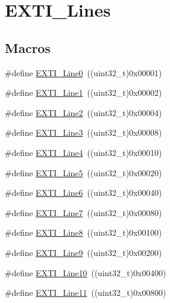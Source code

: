 \hypertarget{group___e_x_t_i___lines}{\section{E\-X\-T\-I\-\_\-\-Lines}
\label{group___e_x_t_i___lines}
}
\subsection*{Macros}
\begin{DoxyCompactItemize}
\item 
\#define \hyperlink{group___e_x_t_i___lines_gac2a65680200dd5f4f7eab29cd4091a75}{E\-X\-T\-I\-\_\-\-Line0}~((uint32\-\_\-t)0x00001)
\item 
\#define \hyperlink{group___e_x_t_i___lines_gae7c6ab2a0880ce3810641ee0585104cd}{E\-X\-T\-I\-\_\-\-Line1}~((uint32\-\_\-t)0x00002)
\item 
\#define \hyperlink{group___e_x_t_i___lines_gaec4189bb2709c8c15a0339d1b0b9865a}{E\-X\-T\-I\-\_\-\-Line2}~((uint32\-\_\-t)0x00004)
\item 
\#define \hyperlink{group___e_x_t_i___lines_gadea3ef6ab7e8bacc686689de8711b98c}{E\-X\-T\-I\-\_\-\-Line3}~((uint32\-\_\-t)0x00008)
\item 
\#define \hyperlink{group___e_x_t_i___lines_gab33b1fe19306e9e60f8f8d0928b800be}{E\-X\-T\-I\-\_\-\-Line4}~((uint32\-\_\-t)0x00010)
\item 
\#define \hyperlink{group___e_x_t_i___lines_ga6b4c6292e3abd521cab2bf99d37a15c6}{E\-X\-T\-I\-\_\-\-Line5}~((uint32\-\_\-t)0x00020)
\item 
\#define \hyperlink{group___e_x_t_i___lines_ga97a5145d1d2612dd53bdd9db3d366873}{E\-X\-T\-I\-\_\-\-Line6}~((uint32\-\_\-t)0x00040)
\item 
\#define \hyperlink{group___e_x_t_i___lines_ga3b7155d54a4a98394b599718901ccbe5}{E\-X\-T\-I\-\_\-\-Line7}~((uint32\-\_\-t)0x00080)
\item 
\#define \hyperlink{group___e_x_t_i___lines_gacd51e087a088c3315049394cddf79e88}{E\-X\-T\-I\-\_\-\-Line8}~((uint32\-\_\-t)0x00100)
\item 
\#define \hyperlink{group___e_x_t_i___lines_ga340ca6bb77b7a2d7747c78e7d3370360}{E\-X\-T\-I\-\_\-\-Line9}~((uint32\-\_\-t)0x00200)
\item 
\#define \hyperlink{group___e_x_t_i___lines_gaefb90b266f5fc1571ed4606bbff1f1d7}{E\-X\-T\-I\-\_\-\-Line10}~((uint32\-\_\-t)0x00400)
\item 
\#define \hyperlink{group___e_x_t_i___lines_ga6157b34c53e9b5cb8ee0d7ac3f5ba292}{E\-X\-T\-I\-\_\-\-Line11}~((uint32\-\_\-t)0x00800)

\end{DoxyCompactItemize}
